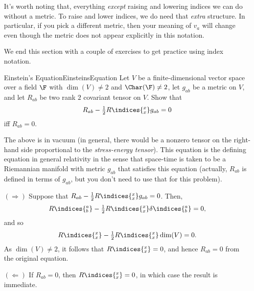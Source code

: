 It's worth noting that, everything \emph{except} raising and lowering indices we can do without a metric.  To raise and lower indices, we do need that \emph{extra} structure.  In particular, if you pick a different metric, then your meaning of $v_a$ will change even though the metric does not appear explicitly in this notation.

We end this section with a couple of exercises to get practice using index notation.
\begin{exr}{Einstein's Equation}{EinsteinsEquation}
	Let $V$ be a finite-dimensional vector space over a field $\F$ with $\dim (V)\neq 2$ and $\Char (\F )\neq 2$, let $g_{ab}$ be a metric on $V$, and let $R_{ab}$ be two rank $2$ covariant tensor on $V$.  Show that
	\begin{equation}
		R_{ab}-\tfrac{1}{2}R\indices{^x_x}g_{ab}=0
	\end{equation}
	iff $R_{ab}=0$.
	\begin{rmk}
		The above is  in vacuum (in general, there would be a nonzero tensor on the right-hand side proportional to the \emph{stress-energy tensor}).  This equation is the defining equation in general relativity in the sense that space-time is taken to be a Riemannian manifold with metric $g_{ab}$ that satisfies this equation (actually, $R_{ab}$ is defined in terms of $g_{ab}$, but you don't need to use that for this problem).
	\end{rmk}
	\begin{solution}
		$(\Rightarrow )$ Suppose that $R_{ab}-\frac{1}{2}R\indices{^x_x}g_{ab}=0$.  Then,
		\begin{equation}
		R\indices{^a_b}-\tfrac{1}{2}R\indices{^x_x}\delta \indices{^a_b}=0,
		\end{equation}
		and so
		\begin{equation}
		R\indices{^x_x}-\tfrac{1}{2}R\indices{^x_x}\dim (V)=0.
		\end{equation}
		As $\dim (V)\neq 2$, it follows that $R\indices{^x_x}=0$, and hence $R_{ab}=0$ from the original equation.
		
		\blni
		$(\Leftarrow )$ If $R_{ab}=0$, then $R\indices{^x_x}=0$, in which case the result is immediate.
	\end{solution}
\end{exr}

